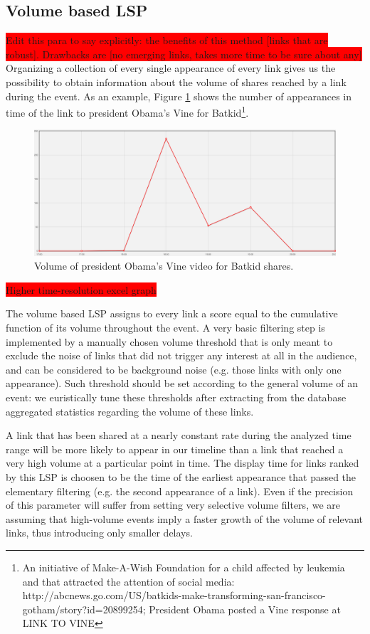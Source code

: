 \documentclass{sig-alternate}
\newcommand{\todo}[1]{\colorbox{red}{#1}}
\begin{document}
\subsection{Volume based LSP}
\label{sec:volume_based_links_selection}
\todo{Edit this para to say explicitly: the benefits of this method [links that are robust]. Drawbacks are [no emerging links, takes more time to be sure about any]}
Organizing a collection of every single appearance of every link gives us the possibility to obtain information about the volume of shares reached by a link during the event. As an example, Figure \ref{fig:batkid_whitehouse_volume} shows the number of appearances in time of the link to president Obama's Vine for Batkid\footnote{An initiative of Make-A-Wish Foundation for a child affected by leukemia and that attracted the attention of social media: http://abcnews.go.com/US/batkids-make-transforming-san-francisco-gotham/story?id=20899254; President Obama posted a Vine response at LINK TO VINE}.
\begin{figure}[htbp]
  \centering
  \includegraphics[width=\linewidth]{Figures/batkid_whitehouse_volume.png}
  \caption{Volume of president Obama's Vine video for Batkid shares.}
  \label{fig:batkid_whitehouse_volume}
\end{figure} \todo{Higher time-resolution excel graph}

The volume based LSP assigns to every link a score equal to the cumulative function of its volume throughout the event. A very basic filtering step is implemented by a manually chosen volume threshold that is only meant to exclude the noise of links that did not trigger any interest at all in the audience, and can be considered to be background noise (e.g. those links with only one appearance). Such threshold should be set according to the general volume of an event: we euristically tune these thresholds after extracting from the database aggregated statistics regarding the volume of these links. 

A link that has been shared at a nearly constant rate during the analyzed time range will be more likely to appear in our timeline than a link that reached a very high volume at a particular point in time. The display time for links ranked by this LSP is choosen to be the time of the earliest appearance that passed the elementary filtering (e.g. the second appearance of a link). Even if the precision of this parameter will suffer from setting very selective volume filters, we are assuming that high-volume events imply a faster growth of the volume of relevant links, thus introducing only smaller delays.
\end{document}
